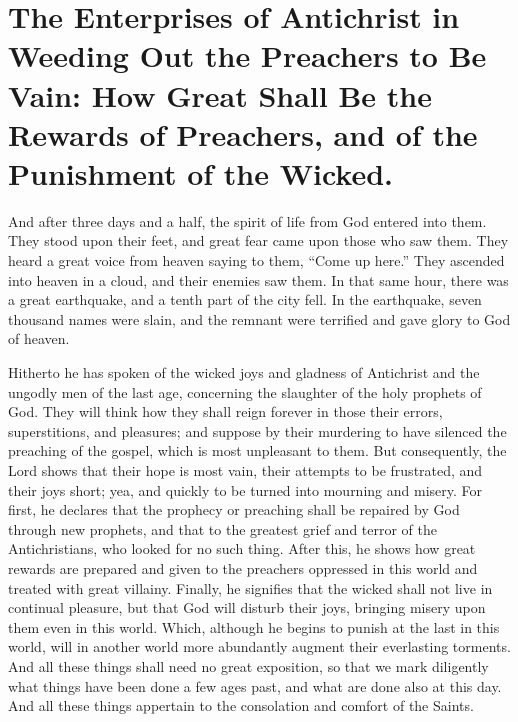 \chapter[Sermon 49. The Enterprises of Antichrist in Weeding Out the Preachers to Be Vain: How Great Shall Be the Rewards of Preachers, and of the Punishment of the Wicked.]{The Enterprises of Antichrist in Weeding Out the Preachers to Be Vain: How Great Shall Be the Rewards of Preachers, and of the Punishment of the Wicked.}
\label{sermon:049}

And after three days and a half, the spirit of life from God entered into them. They stood upon their feet, and great fear came upon those who saw them. They heard a great voice from heaven saying to them, “Come up here.” They ascended into heaven in a cloud, and their enemies saw them. In that same hour, there was a great earthquake, and a tenth part of the city fell. In the earthquake, seven thousand names were slain, and the remnant were terrified and gave glory to God of heaven.

Hitherto he has spoken of the wicked joys and gladness of Antichrist and the ungodly men of the last age, concerning the slaughter of the holy prophets of God. They will think how they shall reign forever in those their errors, superstitions, and pleasures; and suppose by their murdering to have silenced the preaching of the gospel, which is most unpleasant to them. But consequently, the Lord shows that their hope is most vain, their attempts to be frustrated, and their joys short; yea, and quickly to be turned into mourning and misery. For first, he declares that the prophecy or preaching shall be repaired by God through new prophets, and that to the greatest grief and terror of the Antichristians, who looked for no such thing. After this, he shows how great rewards are prepared and given to the preachers oppressed in this world and treated with great villainy. Finally, he signifies that the wicked shall not live in continual pleasure, but that God will disturb their joys, bringing misery upon them even in this world. Which, although he begins to punish at the last in this world, will in another world more abundantly augment their everlasting torments. And all these things shall need no great exposition, so that we mark diligently what things have been done a few ages past, and what are done also at this day. And all these things appertain to the consolation and comfort of the Saints.

